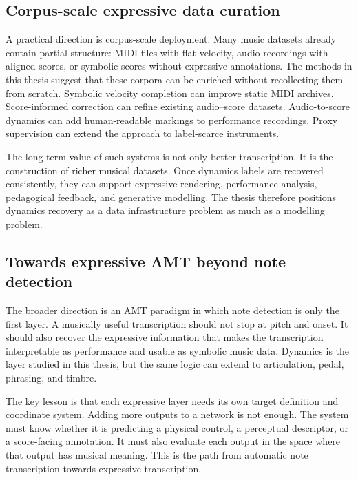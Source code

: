 \subsection{Corpus-scale expressive data curation}
\label{ssec:conclusion:future_curation}

A practical direction is corpus-scale deployment. Many music datasets already contain partial structure: MIDI files with flat velocity, audio recordings with aligned scores, or symbolic scores without expressive annotations. The methods in this thesis suggest that these corpora can be enriched without recollecting them from scratch. Symbolic velocity completion can improve static MIDI archives. Score-informed correction can refine existing audio--score datasets. Audio-to-score dynamics can add human-readable markings to performance recordings. Proxy supervision can extend the approach to label-scarce instruments.

The long-term value of such systems is not only better transcription. It is the construction of richer musical datasets. Once dynamics labels are recovered consistently, they can support expressive rendering, performance analysis, pedagogical feedback, and generative modelling. The thesis therefore positions dynamics recovery as a data infrastructure problem as much as a modelling problem.

\subsection{Towards expressive AMT beyond note detection}
\label{ssec:conclusion:future_amt}

The broader direction is an AMT paradigm in which note detection is only the first layer. A musically useful transcription should not stop at pitch and onset. It should also recover the expressive information that makes the transcription interpretable as performance and usable as symbolic music data. Dynamics is the layer studied in this thesis, but the same logic can extend to articulation, pedal, phrasing, and timbre.

The key lesson is that each expressive layer needs its own target definition and coordinate system. Adding more outputs to a network is not enough. The system must know whether it is predicting a physical control, a perceptual descriptor, or a score-facing annotation. It must also evaluate each output in the space where that output has musical meaning. This is the path from automatic note transcription towards expressive transcription.

